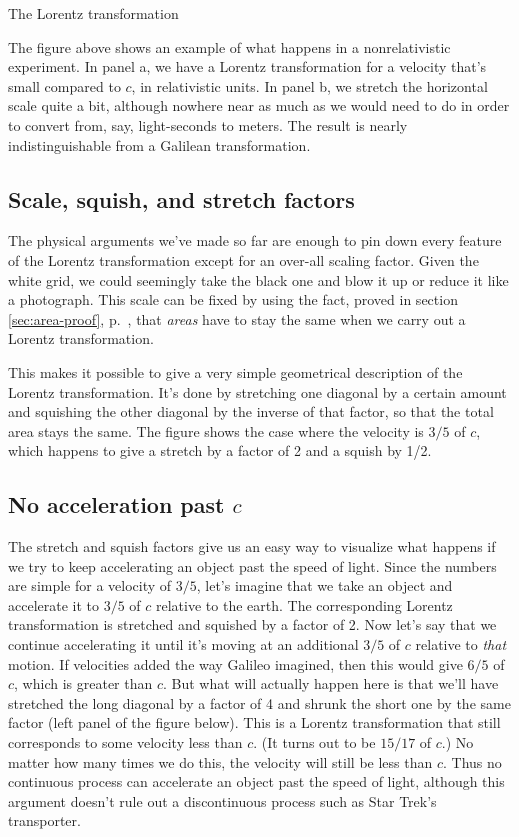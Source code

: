 \begin{section}{The Lorentz transformation}



The figure above shows an example of what happens in a nonrelativistic experiment. In panel a,
we have a Lorentz transformation for a velocity that's small compared to $c$, in relativistic units.
In panel b, we stretch the horizontal scale quite a bit, although nowhere near as much as we would
need to do in order to convert from, say, light-seconds to meters. The result is nearly indistinguishable
from a Galilean transformation.

\section{Scale, squish, and stretch factors}

The physical arguments we've made so far are enough to pin down every feature of the Lorentz transformation
except for an over-all scaling factor. Given the white grid, we could seemingly take the black
one and blow it up or reduce it
like a photograph. This scale can be fixed by using the fact, proved in section \ref{sec:area-proof},
p.~\pageref{sec:area-proof}, that \emph{areas} have to stay the same when we carry out a Lorentz transformation.


This makes it possible to give a very simple geometrical description of the Lorentz transformation.
It's done by stretching one diagonal by a certain amount and squishing the other diagonal by the inverse
of that factor, so that the total area stays the same. The figure shows the case where the velocity is $3/5$ of
$c$, which happens to give a stretch by a factor of 2 and a squish by 1/2.

\section{No acceleration past $c$}

The stretch and squish factors give us an easy way to visualize what happens if we try to keep accelerating
an object past the speed of light. Since the numbers are simple for a velocity of $3/5$, let's imagine that
we take an object and accelerate it to $3/5$ of $c$ relative to the earth. The corresponding Lorentz transformation
is stretched and squished by a factor of 2. Now let's say that we continue accelerating it until it's moving at
an additional $3/5$ of $c$ relative to \emph{that} motion. If velocities added the way Galileo imagined, then this would
give $6/5$ of $c$, which is greater than $c$. But what will actually happen here is that we'll have stretched the
long diagonal by a factor of 4 and shrunk the short one by the same factor (left panel of the figure below).
This is a Lorentz transformation that
still corresponds to some velocity less than $c$. (It turns out to be $15/17$ of $c$.)
No matter how many times we do this, the velocity will still be
less than $c$. Thus no continuous process can accelerate an object past the speed of light, although this
argument doesn't rule out a discontinuous process such as Star Trek's transporter.


\end{section}
